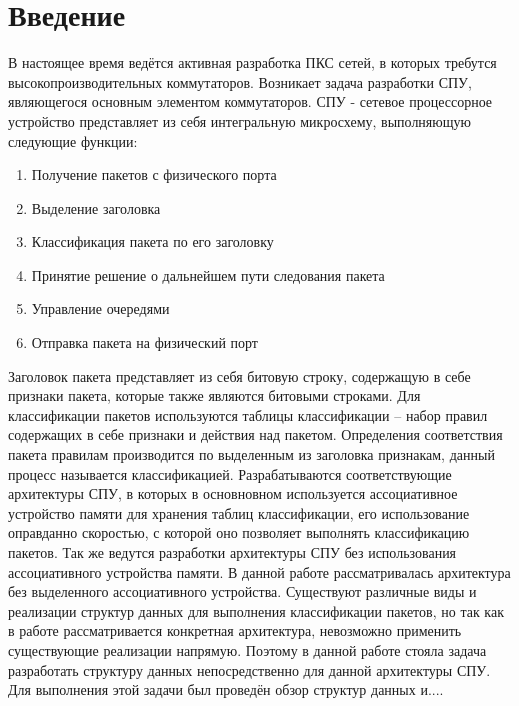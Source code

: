 \documentclass[a4peper, 12pt, titlepage, finall]{report}
\begin{document}
    \chapter*{Введение}
        В настоящее время ведётся активная разработка ПКС сетей, в которых требутся высокопроизводительных коммутаторов.
        Возникает задача разработки СПУ, являющегося основным элементом коммутаторов. СПУ - сетевое процессорное устройство
        представляет из себя интегральную микросхему, выполняющую следующие функции:
        \begin{enumerate}
            \item Получение пакетов с физического порта
            \item Выделение заголовка
            \item Классификация пакета по его заголовку
            \item Принятие решение о дальнейшем пути следования пакета
            \item Управление очередями
            \item Отправка пакета на физический порт
    
        \end{enumerate}
        Заголовок пакета представляет из себя битовую строку, содержащую в себе признаки пакета, которые также являются битовыми строками.
        Для классификации пакетов используются таблицы классификации -- набор правил содержащих в себе признаки и действия над пакетом.
        Определения соответствия пакета правилам производится по выделенным из заголовка признакам, данный процесс называется классификацией.
        Разрабатываются соответствующие архитектуры СПУ, в которых в основновном используется ассоциативное устройство памяти для 
        хранения таблиц классификации, его использование оправданно скоростью, с которой оно позволяет выполнять классификацию пакетов.
        Так же ведутся разработки архитектуры СПУ без использования ассоциативного устройства памяти.
        В данной работе рассматривалась архитектура без выделенного ассоциативного устройства. Существуют различные виды и реализации 
        структур данных для выполнения классификации пакетов\cite{chao2007high:1}, 
        но так как в работе рассматривается конкретная архитектура, невозможно применить существующие реализации напрямую. 
        Поэтому в данной работе стояла задача разработать структуру данных
        непосредственно для данной архитектуры СПУ. Для выполнения этой задачи был проведён обзор структур данных и....       
    
\end{document}

